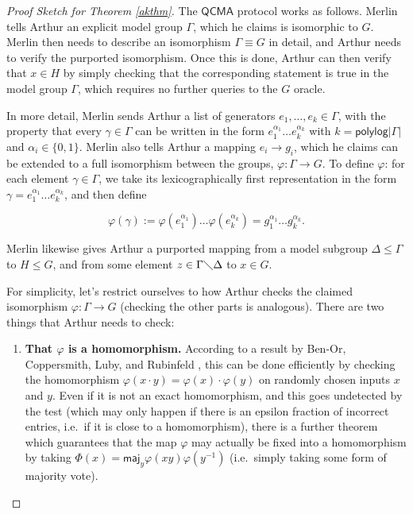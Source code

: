 \documentclass[11pt]{report}
\theoremstyle{plain}
\theoremstyle{definition}
\begin{document}
\begin{proof}[Proof Sketch for Theorem \ref{akthm}]
  The $\mathsf{QCMA}$ protocol works as follows.  Merlin tells Arthur an explicit model group $\Gamma$, which he claims is isomorphic to $G$.  Merlin then needs to describe an isomorphism $\Gamma \equiv G$ in detail, and Arthur needs to verify the purported isomorphism.  Once this is done, Arthur can then verify that $x\in H$ by simply checking that the corresponding statement is true in the model group $\Gamma$, which requires no further queries to the $G$ oracle.

  In more detail, Merlin sends Arthur a list of generators $e_1,
  \ldots, e_k \in \Gamma$, with the property that every $\gamma \in \Gamma$ can be written in the form $e_1^{\alpha_1} \ldots e_k^{\alpha_k}$ with $k = \mathsf{polylog} | \Gamma |$ and $\alpha_i \in \{0,1\}$.  Merlin also tells Arthur a mapping $e_i \rightarrow g_i$,
  which he claims can be extended to a full isomorphism between the groups, $\varphi : \Gamma
  \rightarrow G$.  To define $\varphi$: for each element $\gamma \in
  \Gamma$, we take its lexicographically first representation in the form $\gamma = e_1^{\alpha_1} \ldots
  e_k^{\alpha_k}$, and then define

  $$ \varphi ( \gamma) := \varphi (  e_1^{\alpha_1}) \ldots \varphi ( e_k^{\alpha_k}) = g_1^{\alpha_1} \ldots  g_k^{\alpha_k}. $$

  Merlin likewise gives Arthur a purported mapping from a model subgroup $\Delta \leq \Gamma$ to $H\leq G$, and from some element $z\in \Gamma \diagdown \Delta$ to $x\in G$.

  For simplicity, let's restrict ourselves to how Arthur checks the claimed isomorphism $\varphi : \Gamma
  \rightarrow G$ (checking the other parts is analogous).  There are two things that Arthur needs to check:
  \begin{enumerate}
    \item \textbf{That $\varphi$ is a homomorphism.}
    According to a result by Ben-Or, Coppersmith, Luby, and Rubinfeld \cite{bclr}, this can be done efficiently by checking the homomorphism $\varphi ( x \cdot y) =  \varphi ( x) \cdot \varphi ( y)$ on randomly chosen inputs $x$ and $y$.
    Even if it is not an exact homomorphism, and this goes undetected by the test (which may only happen if there is an epsilon fraction of incorrect entries, i.e.\ if it is close to a homomorphism), there is a further theorem which guarantees that the map $\varphi$ may actually be fixed into a homomorphism by taking $\Phi ( x) = \mathsf{maj}_y   \varphi ( x y) \varphi ( y^{- 1})$ (i.e.\ simply taking some form of majority vote).


\end{enumerate}
\end{proof}
\end{document}

